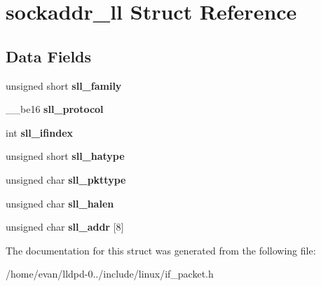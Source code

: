 \section{sockaddr\-\_\-ll \-Struct \-Reference}
\label{structsockaddr__ll}
\subsection*{\-Data \-Fields}
\begin{DoxyCompactItemize}
\item 
unsigned short {\bfseries sll\-\_\-family}\label{structsockaddr__ll_a45c6fbceab06f68084b36ef07a24b623}

\item 
\-\_\-\-\_\-be16 {\bfseries sll\-\_\-protocol}\label{structsockaddr__ll_a4eca5ea5cd91a802aa26fbf7e7ffce52}

\item 
int {\bfseries sll\-\_\-ifindex}\label{structsockaddr__ll_a4b10bae0261377b4a5b29375946c0dc1}

\item 
unsigned short {\bfseries sll\-\_\-hatype}\label{structsockaddr__ll_a8b750291650df4a572b87c5acc910b37}

\item 
unsigned char {\bfseries sll\-\_\-pkttype}\label{structsockaddr__ll_a2e4b82d59e8f559b17964f69f3023a3e}

\item 
unsigned char {\bfseries sll\-\_\-halen}\label{structsockaddr__ll_a0a209669493ffacdfa081e65c887caf9}

\item 
unsigned char {\bfseries sll\-\_\-addr} [8]\label{structsockaddr__ll_a95cc61abc40c12e1d1861c8da1db7264}

\end{DoxyCompactItemize}


\-The documentation for this struct was generated from the following file\-:\begin{DoxyCompactItemize}
\item 
/home/evan/lldpd-\/0../include/linux/if\-\_\-packet.\-h\end{DoxyCompactItemize}

